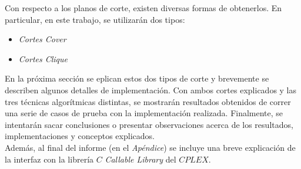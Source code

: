 Con respecto a los planos de corte, existen diversas formas de obtenerlos. En particular, en este trabajo, se utilizarán dos tipos:

\begin{itemize}
\item \emph{Cortes Cover}
\item \emph{Cortes Clique}
\end{itemize}

En la próxima sección se eplican estos dos tipos de corte y brevemente se describen algunos detalles de implementación. Con ambos cortes explicados y las tres técnicas algorítmicas distintas, se mostrarán resultados obtenidos de correr una serie de casos de prueba con la implementación realizada. Finalmente, se intentarán sacar conclusiones o presentar observaciones acerca de los resultados, implementaciones y conceptos explicados.\\

Además, al final del informe (en el \emph{Apéndice}) se incluye una breve explicación de la interfaz con la librería $C$ \emph{Callable Library} del $CPLEX$.
